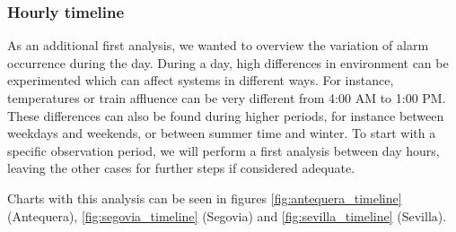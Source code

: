 \documentclass[a4paper,12pt]{article}
\begin{document}
\subsubsection{Hourly timeline}
As an additional first analysis, we wanted to overview the variation of alarm occurrence during the day. During a day, high differences in environment can be experimented which can affect systems in different ways. For instance, temperatures or train affluence can be very different from 4:00 AM to 1:00 PM. These differences can also be found during higher periods, for instance between weekdays and weekends, or between summer time and winter. To start with a specific observation period, we will perform a first analysis between day hours, leaving the other cases for further steps if considered adequate.

Charts with this analysis can be seen in figures \ref{fig:antequera_timeline} (Antequera), \ref{fig:segovia_timeline} (Segovia) and \ref{fig:sevilla_timeline} (Sevilla).
\end{document}

